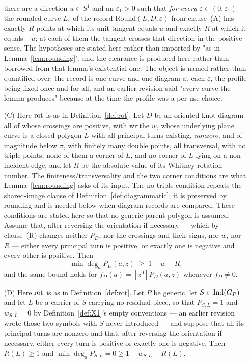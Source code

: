 \begin{theorem}
\begin{enumerate}
there are a direction $u\in S^1$ and an $\varepsilon_1>0$ such that \emph{for
every} $\varepsilon\in(0,\varepsilon_1)$ the rounded curve $L_\varepsilon$ of
the record $\mathrm{Round}(L,D,\varepsilon)$
from clause~(A) has exactly $R$ points at which its unit
tangent equals $u$ and exactly $R$ at which it equals $-u$; at each of them the
tangent crosses that direction in the positive sense. The hypotheses are stated
here rather than imported by "as in Lemma~\ref{lem:rounding}", and the
clearance is produced here rather than borrowed from that lemma's existential
one. The object is named rather than quantified over: the record is one curve
and one diagram at each $\varepsilon$, the profile being fixed once and for all,
and an earlier revision said "every curve the lemma produces" because at the
time the profile was a per-use choice.
\item[(C)] Here $\operatorname{rot}$ is as in Definition~\ref{def:rot}.
Let $D$ be an oriented knot diagram all of whose crossings are positive, with
writhe $w$, whose underlying plane curve is a closed polygon $L$ with all
principal turns existing, \emph{nonzero}, and of magnitude below $\pi$, with
finitely many double points, all transversal, with no triple points, none of
them a corner of $L$, and no corner of $L$ lying on a non-incident edge; and let
$R$ be the absolute value of its Whitney rotation number.  The
finiteness/transversality and the two corner conditions are what
Lemma~\ref{lem:rounding} asks of its input.  The no-triple condition repeats the
shared-image clause of Definition~\ref{def:diagrammatic}; it is preserved by
rounding and is needed below when diagram records are compared.  These
conditions are stated here so that no generic parent polygon is assumed. Assume that, after reversing the
orientation if necessary --- which by clause~(R) changes neither
$P_D$, nor the crossings and their signs, nor $w$, nor $R$ --- either every
principal turn is positive, or exactly one is negative and every other is
positive. Then
\begin{equation}
\min\deg_a P_D(a,z)\;\geq\;1-w-R,
\label{eq:floor}
\end{equation}
and the same bound holds for $f_D(a)=[z^0]P_D(a,z)$ whenever $f_D\neq0$.
\item[(D)] Here $\operatorname{rot}$ is as in Definition~\ref{def:rot}.
Let $P$ be generic, let $S\in\operatorname{Ind}(G_P)$ and let $L$ be a carrier of $S$ carrying
no residual piece, so that $P_{S,L}=1$ and $w_{S,L}=0$ by
Definition~\ref{def:X1}'s empty conventions --- an earlier revision wrote those
two symbols with $S$ never introduced --- and suppose that all its principal turns are nonzero and that,
after reversing the orientation if necessary, either every turn is positive or
exactly one is negative. Then $R(L)\geq1$ and
$\min\deg_a P_{S,L}=0\geq 1-w_{S,L}-R(L)$.
\end{enumerate}
\end{theorem}
